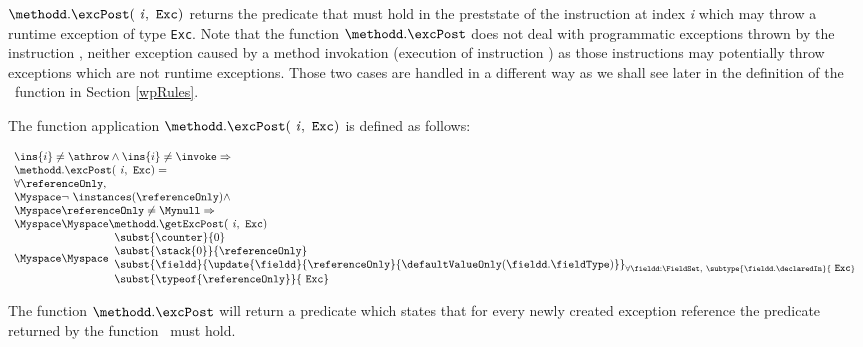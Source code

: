 $ \methodd.\excPost(\mbox{ \rm \textit{i}},  \mbox{ \rm \texttt{Exc}})$ 
returns the predicate that must hold in the preststate of the instruction at index \textit{i}  which may throw a runtime exception of type \texttt{Exc}.
Note that the function $\methodd.\excPost$  does not deal with programmatic exceptions thrown by the instruction \athrow,
 neither exception caused by a method invokation
(execution of instruction \invoke) as those instructions may potentially throw exceptions which are not runtime exceptions.
 Those two cases are handled in a different way as we
 shall see later in the definition of the \fwpi \ function in Section
\ref{wpRules}.  




The function application $\methodd.\excPost( \mbox{ \rm \textit{i}} ,  \mbox{ \rm \texttt{Exc}} )   $ is defined as follows:
\begin{defExcRuntime}   \label{wp:exc:defExcRuntime}
      $$ \begin{array}{l}
            \ins{i} \neq \athrow \wedge \ins{i} \neq \invoke \Rightarrow  \\
           \methodd.\excPost( \mbox{ \rm \textit{i}} ,  \mbox{ \rm \texttt{Exc}}) = \\
                     \forall \referenceOnly,\\
                      \Myspace    \neg \ \instances(\referenceOnly) \wedge \\
		      \Myspace \referenceOnly \neq \Mynull \Rightarrow	\\

       \Myspace    \Myspace    \methodd.\getExcPost(\mbox{ \rm \textit{i}},  \mbox{ \rm \texttt{Exc}})\\
         \Myspace    \Myspace                \begin{array}{l}
                        \subst{\counter}{0} \\
			\subst{\stack{0}}{\referenceOnly} \\
                         \subst{ \fieldd} { \update{\fieldd} { \referenceOnly }{\defaultValueOnly( \fieldd.  \fieldType ) } }_{{\small \forall \fieldd : \FieldSet, \ 
                         \subtype{\fieldd.\declaredIn}{ \mbox{ \rm \texttt{Exc}}} } } \\
			  \subst{ \typeof{\referenceOnly}}{  \mbox{ \rm \texttt{Exc}} } \\
                       \end{array} 
        \end{array}$$   

\end{defExcRuntime} 
   


 




The function $\methodd.\excPost$ will return a predicate which states that for every newly created exception reference  
the predicate returned by the function \getExcPost \ must hold.


 
